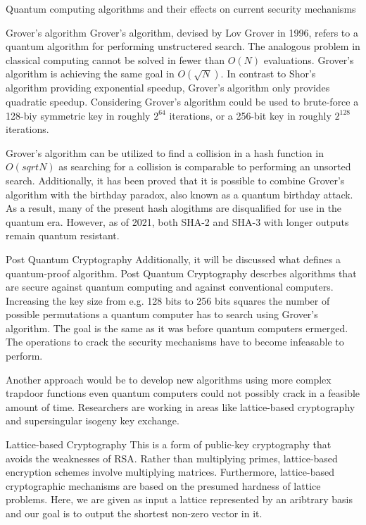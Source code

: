 \documentclass[aps,twocolumn,preprintnumbers]{revtex4}
\begin{document}
\begin{section}{Quantum computing algorithms and their effects on current security mechanisms}
\begin{subsection}{Grover's algorithm}
Grover's algorithm, devised by Lov Grover in 1996,
refers to a quantum algorithm for performing unstructered search. 
The analogous problem in classical computing cannot be solved in fewer than $O(N)$ evaluations. 
Grover's algorithm is achieving the same goal in $O(\sqrt{N})$. 
In contrast to Shor's algorithm providing exponential speedup, 
Grover's algorithm only provides quadratic speedup. 
Considering Grover's algorithm could be used to brute-force a 128-biy symmetric key in roughly $2^{64}$ iterations, 
or a 256-bit key in roughly $2^{128}$ iterations.

Grover's algorithm can be utilized to find a collision in a hash function in $O(sqrt{N})$ as searching for a collision is comparable to performing an unsorted search.
Additionally, it has been proved that it is possible to combine Grover's algorithm with the birthday paradox, 
also known as a quantum birthday attack. 
As a result, many of the present hash alogithms are disqualified for use in the quantum era. 
However, as of 2021, both SHA-2 and SHA-3 with longer outputs remain quantum resistant.
\end{subsection}

\end{section}

\begin{section}{Post Quantum Cryptography}
Additionally, it will be discussed what defines a quantum-proof algorithm. 
Post Quantum Cryptography descrbes algorithms that are secure against quantum computing and against conventional computers.
Increasing the key size from e.g. 128 bits to 256 bits squares the number of possible permutations a quantum computer has to search using Grover's algorithm.
The goal is the same as it was before quantum computers ermerged.
The operations to crack the security mechanisms have to become infeasable to perform. 

Another approach would be to develop new algorithms using more complex trapdoor functions even quantum computers could not possibly crack in a feasible amount of time. 
Researchers are working in areas like lattice-based cryptography and supersingular isogeny key exchange. 

\begin{subsection}{Lattice-based Cryptography}
This is a form of public-key cryptography that avoids the weaknesses of RSA. 
Rather than multiplying primes, lattice-based encryption schemes involve multiplying matrices. 
Furthermore, lattice-based cryptographic mechanisms are based on the presumed hardness of lattice problems. 
Here, we are given as input a lattice represented by an aribtrary basis and our goal is to output the shortest non-zero vector in it.
\end{subsection}

\end{section}
\end{document}

